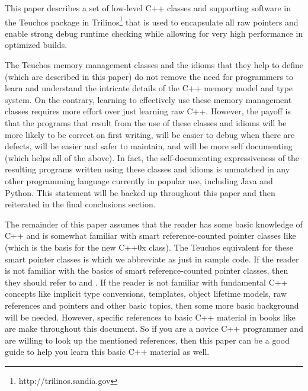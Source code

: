 \documentclass[pdf,ps2pdf,11pt]{SANDreport}
\begin{document}
This paper describes a set of low-level C++ classes and supporting
software in the Teuchos package in
Trilinos\footnote{http://trilinos.sandia.gov} that is used to
encapsulate all raw pointers and enable strong debug runtime checking
while allowing for very high performance in optimized builds.

The Teuchos memory management classes and the idioms that they help to
define (which are described in this paper) do not remove the need for
programmers to learn and understand the intricate details of the C++
memory model and type system.  On the contrary, learning to
effectively use these memory management classes requires more effort
over just learning raw C++.  However, the payoff is that the programs
that result from the use of these classes and idioms will be more
likely to be correct on first writing, will be easier to debug when
there are defects, will be easier and safer to maintain, and will be
more self documenting (which helps all of the above).  In fact, the
self-documenting expressiveness of the resulting programs written
using these classes and idioms is unmatched in any other programming
language currently in popular use, including Java and Python.  This
statement will be backed up throughout this paper and then reiterated
in the final conclusions section.

The remainder of this paper assumes that the reader has some basic
knowledge of C++ and is somewhat familiar with smart reference-counted
pointer classes like {} (which is the basis
for the new C++0x {} class).  The Teuchos
equivalent for these smart pointer classes is {}
which we abbreviate as just {} in sample code.  If the
reader is not familiar with the basics of smart reference-counted
pointer classes, then they should refer to
{}\cite{RefCountPtrBeginnersGuide} and {}\cite{C++CodingStandards05}.
If the reader is not familiar with fundamental C++ concepts like
implicit type conversions, templates, object lifetime models, raw
references and pointers and other basic topics, then some more basic
background will be needed.  However, specific references to basic C++
material in books like {}\cite{EffectiveC++ThirdEdition, stroustrup97,
C++CodingStandards05} are make throughout this document.  So if you
are a novice C++ programmer and are willing to look up the mentioned
references, then this paper can be a good guide to help you learn this
basic C++ material as well.
\end{document}
